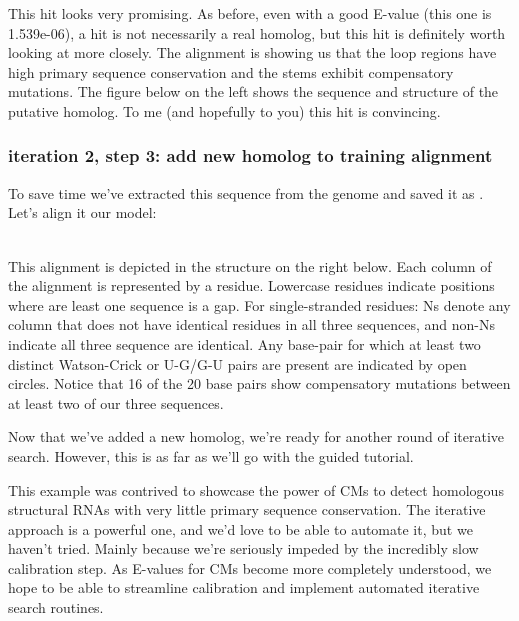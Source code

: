 This hit looks very promising. As before, even with a good E-value
(this one is 1.539e-06), a hit is not necessarily a real homolog, but
this hit is definitely worth looking at more closely. The
 alignment is showing us that the loop regions have
high primary sequence conservation and the stems exhibit
compensatory mutations. The figure below on the left shows the
sequence and structure of the putative homolog. To me (and hopefully to you) this
hit is convincing. 

\subsubsection{iteration 2, step 3: add new homolog to training alignment}
To save time we've extracted this sequence from the genome and saved
it as . Let's align it our model:

\\

This alignment is depicted in the structure on the right below. Each
column of the alignment is represented by a residue. Lowercase
residues indicate positions where are least one sequence is a gap.
For single-stranded residues: Ns denote any column that does not have
identical residues in all three sequences, and non-Ns indicate all
three sequence are identical. Any base-pair for which at least two
distinct Watson-Crick or U-G/G-U pairs are present are indicated by
open circles. Notice that 16 of the 20 base pairs show compensatory
mutations between at least two of our three sequences.

Now that we've added a new homolog, we're ready for another round of
iterative search. However, this is as far as we'll go with the guided
tutorial. 

This example was contrived to showcase the power of CMs to detect
homologous structural RNAs with very little primary sequence
conservation. The iterative approach is a powerful one, and we'd love
to be able to automate it, but we haven't tried. Mainly because we're
seriously impeded by the incredibly slow calibration step. As E-values
for CMs become more completely understood, we hope to be able to
streamline calibration and implement automated iterative search
routines. 

